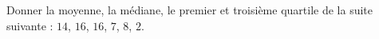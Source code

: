 
\begin{exercice}\label{exosmath-0012}

    Donner la moyenne, la médiane, le premier et troisième quartile de la suite suivante : \( 14\), \( 16\), \( 16\), \( 7\), \( 8\), \( 2\).

\end{exercice}

